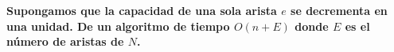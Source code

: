 \textbf{
    Supongamos que la capacidad de una sola arista $e$ se decrementa en una unidad. De un
    algoritmo de tiempo $O(n + E)$ donde $E$ es el número de aristas de $N$.
}\vspace{.2cm}
\textcolor{bibi}{}
\begin{quote}
\end{quote}